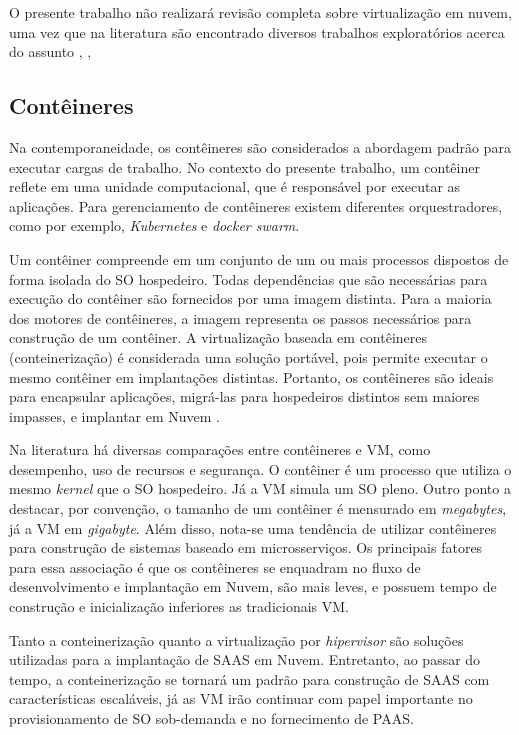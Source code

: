O presente trabalho não realizará revisão completa sobre virtualização em nuvem, uma vez que na literatura são encontrado diversos trabalhos exploratórios acerca do assunto \cite{Assuno}, \cite{lu2014cloud}, \cite{aceto2013cloud}

\subsection{Contêineres}
Na contemporaneidade, os contêineres são considerados a abordagem padrão para executar cargas de trabalho. No contexto do presente trabalho, um contêiner reflete em uma unidade computacional, que é responsável por executar as aplicações. Para gerenciamento de contêineres existem diferentes orquestradores, como por exemplo, \textit{Kubernetes} e \textit{docker swarm}.

Um contêiner compreende em um conjunto de um ou mais processos dispostos de forma isolada do \ac{SO} hospedeiro. Todas dependências que são necessárias para execução do contêiner são fornecidos por uma imagem distinta. Para a maioria dos motores de contêineres, a imagem representa os passos necessários para construção de um contêiner. A virtualização baseada em contêineres (conteinerização) é considerada uma solução portável, pois permite executar o mesmo contêiner em implantações distintas. Portanto, os contêineres são ideais para encapsular aplicações, migrá-las para hospedeiros distintos sem maiores impasses, e implantar em Nuvem .

Na literatura há diversas comparações entre contêineres e \ac{VM}, como desempenho, uso de recursos e segurança. O contêiner é um processo que utiliza o mesmo \textit{kernel} que o \ac{SO} hospedeiro. Já a \ac{VM} simula um \ac{SO} pleno. Outro ponto a destacar, por convenção, o tamanho de um contêiner é mensurado em \textit{megabytes}, já a \ac{VM} em \textit{gigabyte}. Além disso, nota-se uma tendência de utilizar contêineres para construção de sistemas baseado em microsserviços. Os principais fatores para essa associação é que os contêineres se enquadram no fluxo de desenvolvimento e implantação em Nuvem, são mais leves, e possuem tempo de construção e inicialização inferiores as tradicionais \ac{VM}.

Tanto a conteinerização quanto a virtualização por \textit{hipervisor} são soluções utilizadas para a implantação de \ac{SAAS} em Nuvem. Entretanto, ao passar do tempo, a conteinerização se tornará um padrão para construção de \ac{SAAS} com características escaláveis, já as \ac{VM} irão continuar com papel importante no provisionamento de \ac{SO} sob-demanda e no fornecimento de \ac{PAAS}.

